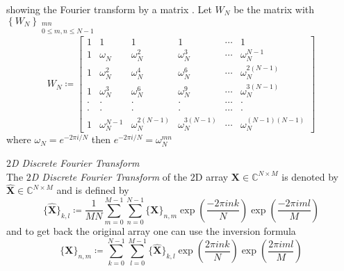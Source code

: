 \begin{Rem}
    showing the Fourier transform by a matrix \cite{wavelets_linear_algebra_frazier} \cite{image_processing_bredies} \cite{signal_miller}.
    Let $W_N$ be the matrix with $\left\{W_N\right\}_{\substack{mn \\ 0 \leq m,n \leq N-1}}$ 
    \begin{equation*}
        W_N \coloneqq 
        \begin{bmatrix}
            1     & 1                & 1                   & 1                   & \cdots & 1                      \\
            1     & \omega_{N}^{}    & \omega_{N}^{2}      & \omega_{N}^{3}      & \cdots & \omega_{N}^{N-1}       \\
            1     & \omega_{N}^{2}   & \omega_{N}^{4}      & \omega_{N}^{6}      & \cdots & \omega_{N}^{2(N-1)}    \\
            1     & \omega_{N}^{3}   & \omega_{N}^{6}      & \omega_{N}^{9}      & \cdots & \omega_{N}^{3(N-1)}    \\
            \cdot & \cdot            & \cdot               & \cdot               & \cdots & \cdot                  \\ 
            \cdot & \cdot            & \cdot               & \cdot               & \cdots & \cdot                  \\ 
            1     & \omega_{N}^{N-1} & \omega_{N}^{2(N-1)} & \omega_{N}^{3(N-1)} & \cdots & \omega_{N}^{(N-1)(N-1)}
            \end{bmatrix}
    \end{equation*}
    where $\omega_N = e^{-2\pi i/N}$ then $e^{-2\pi i/N} = \omega_N^{mn}$
\end{Rem}








\begin{Def}\label{def:2ddft}
    \emph{$2$D Discrete Fourier Transform}\\
    The \emph{$2$D Discrete Fourier Transform} of the $2$D array $\boldsymbol{X} \in \mathbb{C}^{N \times M}$ is denoted by 
    $\hat {\boldsymbol{X}} \in \mathbb{C}^{N \times M}$ and is defined by
    \begin{equation}\label{eq:2ddft}
        \{\hat {\boldsymbol{X}}\}_{k,l} \coloneqq \frac{1}{MN}\sum_{m=0}^{M-1}\sum_{n=0}^{N-1} \{{\boldsymbol{X}}\}_{n,m}\exp\left({\frac{-2\pi ink}{N}}\right)\exp\left({\frac{-2\pi iml}{M}}\right)
    \end{equation}
    and to get back the original array one can use the inversion formula
    \begin{equation}\label{eq:2didft}
        \{{\boldsymbol{X}}\}_{n,m} \coloneqq \sum_{k=0}^{N-1}\sum_{l=0}^{M-1}\{\hat {\boldsymbol{X}}\}_{k,l}\exp\left({\frac{2\pi ink}{N}}\right)\exp\left({\frac{2\pi iml}{M}}\right)
    \end{equation}    
\end{Def}

